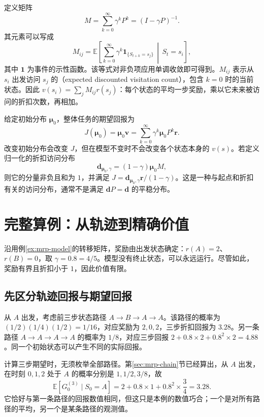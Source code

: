 \documentclass[UTF8]{ctexart}
\begin{document}
定义矩阵
\begin{equation}
  M=\sum_{k=0}^{\infty}\gamma^kP^k=(I-\gamma P)^{-1}.
  \label{eq:mrp-occupancy-matrix}
\end{equation}
其元素可以写成
\begin{equation}
  M_{ij}=\mathbb E\!\left[\sum_{k=0}^{\infty}
       \gamma^k\mathbf 1_{\{S_{t+k}=s_j\}}\,\middle|\,S_t=s_i\right],
  \label{eq:mrp-occupancy-entry}
\end{equation}
其中 $\mathbf 1$ 为事件的示性函数。该等式对非负项应用单调收敛即可得到。$M_{ij}$ 表示从 $s_i$ 出发访问 $s_j$ 的（expected discounted visitation count），包含 $k=0$ 时的当前状态。因此 $v(s_i)=\sum_jM_{ij}r(s_j)$：每个状态的平均一步奖励，乘以它未来被访问的折扣次数，再相加。

给定初始分布 $\boldsymbol\mu_0$，整体任务的期望回报为
\begin{equation}
  J(\boldsymbol\mu_0)=\boldsymbol\mu_0\boldsymbol v
  =\sum_{k=0}^{\infty}\gamma^k\boldsymbol\mu_0P^k\boldsymbol r.
  \label{eq:mrp-start-value}
\end{equation}
改变初始分布会改变 $J$，但在模型不变时不会改变各个状态本身的 $v(s)$。若定义归一化的折扣访问分布
\[
  \boldsymbol d_{\boldsymbol\mu_0,\gamma}
  =(1-\gamma)\boldsymbol\mu_0M,
\]
则它的分量非负且和为 $1$，并满足 $J=\boldsymbol d_{\boldsymbol\mu_0,\gamma}\boldsymbol r/(1-\gamma)$。这是一种与起点和折扣有关的访问分布，通常不是满足 $\boldsymbol dP=\boldsymbol d$ 的平稳分布。

\section{完整算例：从轨迹到精确价值}
\label{sec:mrp-worked-example}

沿用例\ref{ex:mrp-model}的转移矩阵，奖励由出发状态确定：$r(A)=2$、$r(B)=0$，取 $\gamma=0.8=4/5$。模型没有终止状态，可以永远运行。尽管如此，奖励有界且折扣小于 $1$，因此价值有限。

\subsection{先区分轨迹回报与期望回报}

从 $A$ 出发，考虑前三步状态路径 $A\to B\to A\to A$。该路径的概率为 $(1/2)(1/4)(1/2)=1/16$，对应奖励为 $2,0,2$，三步折扣回报为 $3.28$。另一条路径 $A\to A\to A\to A$ 的概率为 $1/8$，对应三步回报 $2+0.8\times2+0.8^2\times2=4.88$。同一个初始状态可以产生不同的实际回报。

计算三步期望时，无须枚举全部路径。第\ref{sec:mrp-chain}节已经算出，从 $A$ 出发，在时刻 $0,1,2$ 处于 $A$ 的概率分别是 $1,1/2,3/8$，故
\[
  \mathbb E[G_0^{(3)}\mid S_0=A]
  =2+0.8\times1+0.8^2\times\frac34=3.28.
\]
它恰好与第一条路径的回报数值相同，但这只是本例的数值巧合；一个是对所有路径的平均，另一个是某条路径的观测值。
\end{document}
